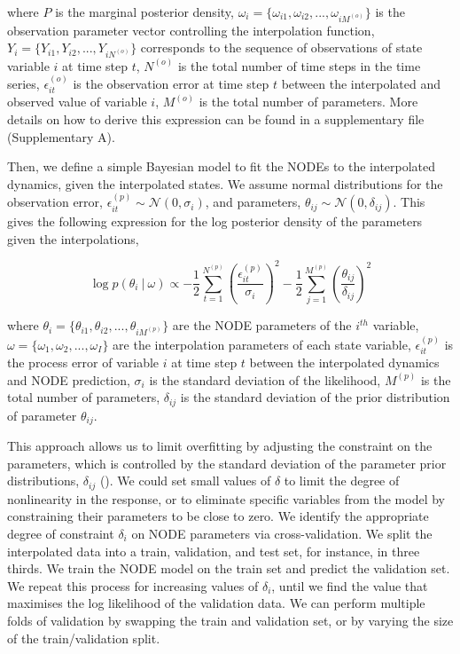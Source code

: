 \documentclass[11pt, oneside]{article}
\begin{document}
where $P$ is the marginal posterior density,
$\omega_i = \{\omega_{i1},\omega_{i2},...,\omega_{iM^{(o)}}\}$ is the observation parameter vector controlling the interpolation function,
$Y_i = \{Y_{i1},Y_{i2},...,Y_{iN^{(o)}}\}$ corresponds to the sequence of observations of state variable $i$ at time step $t$, 
$N^{(o)}$ is the total number of time steps in the time series, 
$\epsilon^{(o)}_{it}$ is the observation error at time step $t$ between the interpolated and observed  value of variable $i$, 
$M^{(o)}$ is the total number of parameters. 
More details on how to derive this expression can be found in a supplementary file (Supplementary A).

Then, we define a simple Bayesian model to fit the NODEs to the interpolated dynamics, given the interpolated states.
We assume normal distributions for the observation error, $\epsilon^{(p)}_{it} \sim \mathcal{N}(0,\sigma_i)$, and parameters, $\theta_{ij} \sim \mathcal{N}(0,\delta_{ij})$.
This gives the following expression for the log posterior density of the parameters given the interpolations,

\vspace{-0.5cm}
\begin{equation}
    \log p(\theta_i ~|~ \omega) \propto - \frac{1}{2} \sum_{t=1}^{N^{(p)}} \left( \frac{\epsilon^{(p)}_{it}}{\sigma_i} \right)^2 - \frac{1}{2} \sum_{j=1}^{M^{(p)}} \left( \frac{\theta_{ij}}{\delta_{ij}} \right)^2
\end{equation}

where $\theta_i = \{\theta_{i1},\theta_{i2},...,\theta_{iM^{(p)}}\}$ are the NODE parameters of the $i^{th}$ variable,
$\omega = \{\omega_1,\omega_2,...,\omega_I\}$ are the interpolation parameters of each state variable, 
$\epsilon^{(p)}_{it}$ is the process error of variable $i$ at time step $t$ between the interpolated dynamics and NODE prediction, 
$\sigma_i$ is the standard deviation of the likelihood, 
$M^{(p)}$ is the total number of parameters, 
$\delta_{ij}$ is the standard deviation of the prior distribution of parameter $\theta_{ij}$.

This approach allows us to limit overfitting by adjusting the constraint on the parameters, which is controlled by the standard deviation of the parameter prior distributions, $\delta_{ij}$ (\cite{Cawley2007, Bonnaffe2021a}).
We could set small values of $\delta$ to limit the degree of nonlinearity in the response, or to eliminate specific variables from the model by constraining their parameters to be close to zero.
We identify the appropriate degree of constraint $\delta_{i}$ on NODE parameters via cross-validation. 
We split the interpolated data into a train, validation, and test set, for instance, in three thirds.
We train the NODE model on the train set and predict the validation set.
We repeat this process for increasing values of $\delta_{i}$, until we find the value that maximises the log likelihood of the validation data.
We can perform multiple folds of validation by swapping the train and validation set, or by varying the size of the train/validation split.
\end{document}
